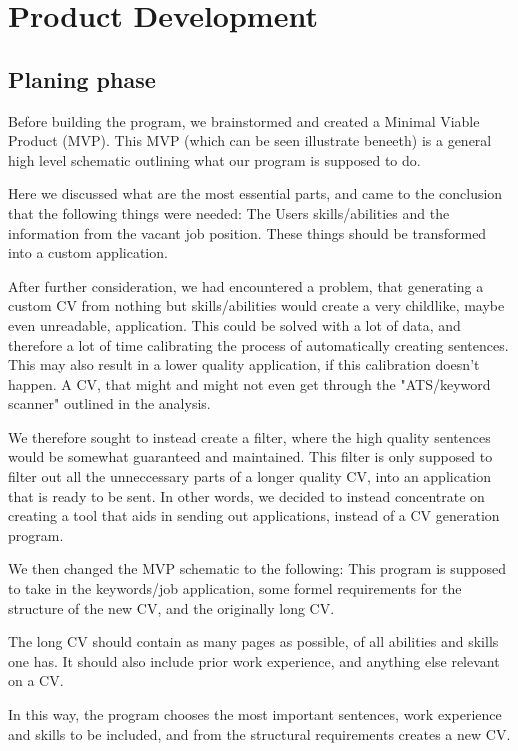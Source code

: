\section{Product Development}\label{sec:product_development}
\subsection{Planing phase}
Before building the program, we brainstormed and created a Minimal Viable Product (MVP).
This MVP (which can be seen illustrate beneeth) is a general high level schematic outlining what our program is supposed to do.

Here we discussed what are the most essential parts, and came to the conclusion that the following things
were needed: The Users skills/abilities and the information from the vacant job position. These things
should be transformed into a custom application. 

After further consideration, we had encountered a problem, that generating a custom CV from nothing but
skills/abilities would create a very childlike, maybe even unreadable, application. This could be solved with a lot
of data, and therefore a lot of time calibrating the process of automatically creating sentences. This may also result
in a lower quality application, if this calibration doesn't happen. 
A CV, that might and might not even get through the "ATS/keyword scanner" outlined in the analysis. 

We therefore sought to instead create a filter, where the high quality sentences would be somewhat guaranteed and maintained.
This filter is only supposed to filter out all the unneccessary parts of a longer quality CV, into an application that
is ready to be sent. In other words, we decided to instead concentrate on creating a tool that aids
in sending out applications, instead of a CV generation program.

We then changed the MVP schematic to the following:
This program is supposed to take in the keywords/job application, some formel requirements for
the structure of the new CV, and the originally long CV. 

The long CV should contain as many pages as possible, of all abilities and skills one has.
It should also include prior work experience, and anything else relevant on a CV. 

In this way, the program chooses the most important sentences, work experience and skills to be included,
and from the structural requirements creates a new CV.


